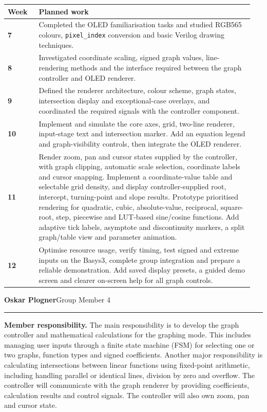 \documentclass[10pt,a4paper]{article}
\makeatletter
\newcommand{\member}[2]{%
  \vspace{2pt}%
  {\bfseries\large #1}\hfill{\small #2}\par
  \vspace{1pt}\hrule\vspace{3pt}%
}
\newcommand{\role}{\textbf{Member responsibility.} }
\newenvironment{timeline}{%
  \vspace{2pt}%
  \begin{tabular}{@{}>{\bfseries}p{0.12\linewidth}p{0.83\linewidth}@{}}%
  \hline
  Week & \textbf{Planned work}\\
  \hline
}{%
  \hline
  \end{tabular}%
  \vspace{2pt}%
}
\newcommand{\wk}[2]{#1 & #2\\}
\makeatother
\begin{document}
\begin{timeline}
\wk{7}{Completed the OLED familiarisation tasks and studied RGB565 colours,
\texttt{pixel\_index} conversion and basic Verilog drawing techniques.}

\wk{8}{Investigated coordinate scaling, signed graph values, line-rendering
methods and the interface required between the graph controller and OLED
renderer.}

\wk{9}{Defined the renderer architecture, colour scheme, graph states,
intersection display and exceptional-case overlays, and coordinated the
required signals with the controller component.}

\wk{10}{Implement and simulate the core axes, grid, two-line renderer,
input-stage text and intersection marker. Add an equation legend and
graph-visibility controls, then integrate the OLED renderer.}

\wk{11}{Render zoom, pan and cursor states supplied by the controller, with graph
clipping, automatic scale selection, coordinate labels and cursor snapping.
Implement a coordinate-value table and selectable grid density, and display
controller-supplied root, intercept, turning-point and slope results. Prototype
prioritised rendering for quadratic, cubic,
absolute-value, reciprocal, square-root, step, piecewise and LUT-based
sine/cosine functions. Add
adaptive tick labels, asymptote and discontinuity markers, a split graph/table
view and parameter animation.}

\wk{12}{Optimise resource usage, verify timing, test signed and extreme inputs
on the Basys3, complete group integration and prepare a reliable demonstration.
Add saved display presets, a guided demo screen and clearer
on-screen help for all graph controls.}
\end{timeline}

\member{Oskar Plogner}{Group Member 4}
\role
The main responsibility is to develop the graph controller and mathematical
calculations for the graphing mode. This includes managing user inputs through
a finite state machine (FSM) for selecting one or two graphs, function types and
signed coefficients. Another major responsibility is
calculating intersections between linear functions using fixed-point
arithmetic, including handling parallel or identical lines, division by zero
and overflow. The controller will communicate with the graph renderer by
providing coefficients, calculation results and control signals. The controller
will also own zoom, pan and cursor state.
\end{document}
